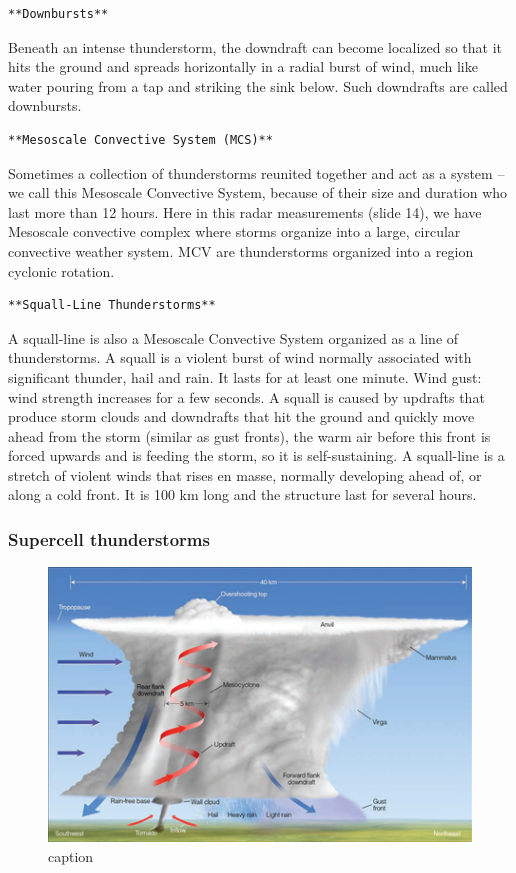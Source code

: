 \documentclass[12pt,oneside]{book}
\begin{document}
\begin{verbatim}
**Downbursts**
\end{verbatim}

Beneath an intense thunderstorm, the downdraft can become localized so
that it hits the ground and spreads horizontally in a radial burst of
wind, much like water pouring from a tap and striking the sink below.
Such downdrafts are called downbursts.

\begin{verbatim}
**Mesoscale Convective System (MCS)**
\end{verbatim}

Sometimes a collection of thunderstorms reunited together and act as a
system -- we call this Mesoscale Convective System, because of their
size and duration who last more than 12 hours. Here in this radar
measurements (slide 14), we have Mesoscale convective complex where
storms organize into a large, circular convective weather system. MCV
are thunderstorms organized into a region cyclonic rotation.

\begin{verbatim}
**Squall-Line Thunderstorms**
\end{verbatim}

A squall-line is also a Mesoscale Convective System organized as a line
of thunderstorms. A squall is a violent burst of wind normally
associated with significant thunder, hail and rain. It lasts for at
least one minute. Wind gust: wind strength increases for a few seconds.
A squall is caused by updrafts that produce storm clouds and downdrafts
that hit the ground and quickly move ahead from the storm (similar as
gust fronts), the warm air before this front is forced upwards and is
feeding the storm, so it is self-sustaining. A squall-line is a stretch
of violent winds that rises en masse, normally developing ahead of, or
along a cold front. It is 100 km long and the structure last for several
hours.

\subsubsection{Supercell thunderstorms}\label{supercell-thunderstorms}

\begin{figure}

{\centering \includegraphics[width=0.8\linewidth]{figures/FigureE4} 

}

\caption{caption}\label{fig:Supercellthunderstorms}
\end{figure}
\end{document}
